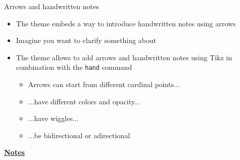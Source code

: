 \documentclass[10pt]{beamer}
\begin{document}
\begin{frame}[t]
    {Arrows and handwritten notes}\bigskip
    \begin{itemize}
        \item The theme embeds a way to introduce handwritten notes using arrows \bigskip\medskip
        \item Imagine you want to clarify something about  \bigskip\medskip
        \item The theme allows to add arrows and handwritten notes using Tikz in combination with the \texttt{hand} command \medskip
        \begin{itemize}
            \item Arrows can start from different cardinal points... \medskip
            \item ...have different colors and opacity... \medskip
            \item ...have wiggles... \medskip
            \item ...be bidirectional or adirectional
        \end{itemize}
    \end{itemize}
\end{frame}
\begin{flushleft}
    \underline{\textbf{Notes}}\setlength{\parskip}{.15cm}\notesize\newline\par
\end{flushleft}
\end{document}
